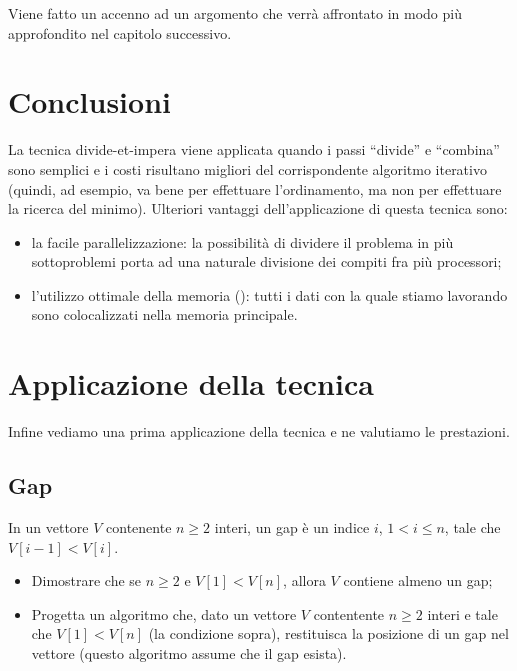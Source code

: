 Viene fatto un accenno ad un argomento che verrà affrontato in modo più approfondito nel capitolo successivo.

\section{Conclusioni}

La tecnica divide-et-impera viene applicata quando i passi \enquote{divide} e \enquote{combina} sono semplici e i costi risultano migliori del corrispondente algoritmo iterativo (quindi, ad esempio, va bene per effettuare l'ordinamento, ma non per effettuare la ricerca del minimo).
Ulteriori vantaggi dell'applicazione di questa tecnica sono:
\begin{itemize}
	\item la facile parallelizzazione: la possibilità di dividere il problema in più sottoproblemi porta ad una naturale divisione dei compiti fra più processori;
	\item l'utilizzo ottimale della memoria  (): tutti i dati con la quale stiamo lavorando sono colocalizzati nella memoria principale.
\end{itemize}

\section{Applicazione della tecnica}

Infine vediamo una prima applicazione della tecnica e ne valutiamo le prestazioni.

\subsection{Gap}

In un vettore \(V\) contenente \(n \geqslant 2\) interi, un gap è un indice \(i\), \(1 < i \leqslant n\), tale che \(V[i-1] < V[i]\).
\begin{itemize}
	\item Dimostrare che se \(n \geqslant 2\) e \(V[1] < V[n]\), allora \(V\) contiene almeno un gap;
	\item Progetta un algoritmo che, dato un vettore \(V\) contentente \(n \geqslant 2\) interi e tale che \(V[1] < V[n]\) (la condizione sopra), restituisca la posizione di un gap nel vettore (questo algoritmo assume che il gap esista).
\end{itemize}

